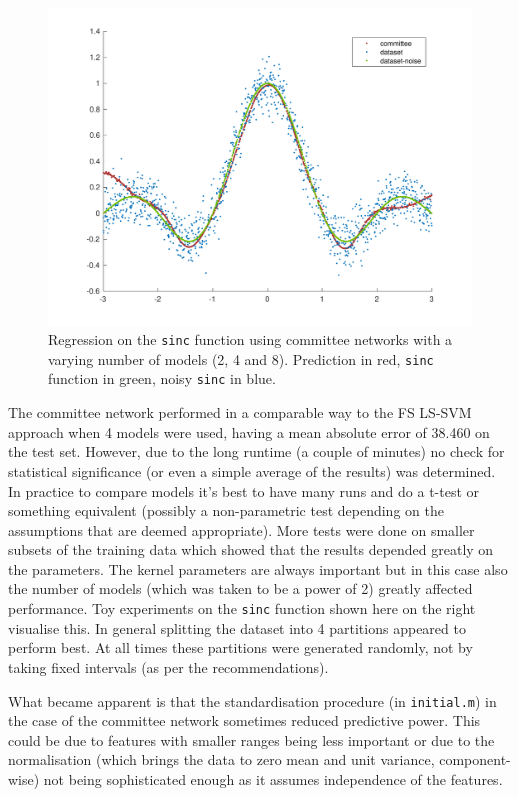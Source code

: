 \begin{figure}
\begin{minipage}{\linewidth}
\includegraphics[width=\linewidth]{../src/figures/committee/sinc_8_models}
\end{minipage}
\caption{Regression on the \texttt{sinc} function using committee networks with a varying number of models (2, 4 and 8). Prediction in red, \texttt{sinc} function in green, noisy \texttt{sinc} in blue.}
\label{committeesinc}
\end{figure}

\par The committee network performed in a comparable way to the FS LS-SVM approach when 4 models were used, having a mean absolute error of 38.460 on the test set. However, due to the long runtime (a couple of minutes) no check for statistical significance (or even a simple average of the results) was determined. In practice to compare models it's best to have many runs and do a t-test or something equivalent (possibly a non-parametric test depending on the assumptions that are deemed appropriate). More tests were done on smaller subsets of the training data which showed that the results depended greatly on the parameters. The kernel parameters are always important but in this case also the number of models (which was taken to be a power of 2) greatly affected performance. Toy experiments on the \texttt{sinc} function shown here on the right visualise this. In general splitting the dataset into 4 partitions appeared to perform best. At all times these partitions were generated randomly, not by taking fixed intervals (as per the recommendations).

\par What became apparent is that the standardisation procedure (in \texttt{initial.m}) in the case of the committee network sometimes reduced predictive power. This could be due to features with smaller ranges being less important or due to the normalisation (which brings the data to zero mean and unit variance, component-wise) not being sophisticated enough as it assumes independence of the features.


